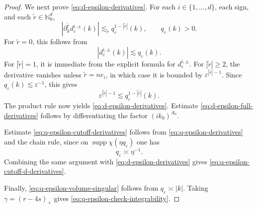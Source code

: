 \documentclass{article}
\numberwithin{equation}{section}
\theoremstyle{plain}
\theoremstyle{definition}
\begin{document}
\begin{proof}
	We next prove \eqref{eq:d-epsilon-derivatives}. For each
	\(i\in\{1,\ldots,d\}\), each sign, and each
	\(\tilde r\in\mathbb N_0^d\),
	\[
	\left|
	\partial_k^{\tilde r}d_\varepsilon^{i,\pm}(k)
	\right|
	\lesssim_{\tilde r}
	q_\varepsilon^{1-|\tilde r|}(k),
	\qquad q_\varepsilon(k)>0.
	\]
	For \(\tilde r=0\), this follows from
	\[
	|d_\varepsilon^{i,\pm}(k)|
	\lesssim q_\varepsilon(k).
	\]
	For \(|\tilde r|=1\), it is immediate from the explicit formula for
	\(d_\varepsilon^{i,\pm}\). For \(|\tilde r|\geqslant2\), the
	derivative vanishes unless \(\tilde r=ne_i\), in which case it is
	bounded by \(\varepsilon^{|\tilde r|-1}\). Since
	\(q_\varepsilon(k)\lesssim\varepsilon^{-1}\), this gives
	\[
	\varepsilon^{|\tilde r|-1}
	\lesssim
	q_\varepsilon^{1-|\tilde r|}(k).
	\]
	The product rule now yields
	\eqref{eq:d-epsilon-derivatives}. Estimate
	\eqref{eq:d-epsilon-full-derivatives} follows by differentiating
	the factor \((ik_0)^{A_0}\).
	
	Estimate \eqref{eq:q-epsilon-cutoff-derivatives} follows from
	\eqref{eq:q-epsilon-derivatives} and the chain rule, since on
	\(\operatorname{supp}\chi(\eta q_\varepsilon)\) one has
	\[
	q_\varepsilon\asymp\eta^{-1}.
	\]
	Combining the same argument with
	\eqref{eq:d-epsilon-derivatives} gives
	\eqref{eq:q-epsilon-cutoff-d-derivatives}.
	
	Finally, \eqref{eq:q-epsilon-volume-singular} follows from
	\(q_\varepsilon\asymp|k|\). Taking
	\(\gamma=(r-4s)_+\) gives
	\eqref{eq:q-epsilon-check-integrability}.
\end{proof}
\end{document}
